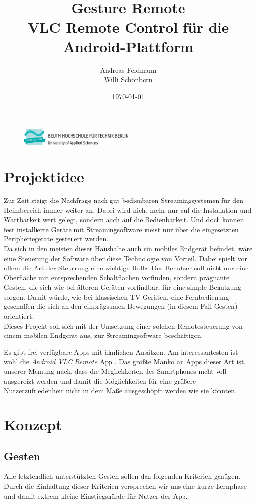 \documentclass[a4paper,12pt]{article}
\title{Gesture Remote \\ VLC Remote Control für die Android-Plattform}
\author{Andreas Feldmann \\ Willi Schönborn}
\date{\today}
\begin{document}
\begin{figure}[H]
\centering
\includegraphics[width=0.5\textwidth]{beuth.eps}
\maketitle
\end{figure}
\newpage
\tableofcontents
\newpage
\section{Projektidee}
Zur Zeit steigt die Nachfrage nach gut bedienbaren Streamingsystemen für den Heimbereich immer weiter an. Dabei wird nicht mehr nur auf die Installation und Wartbarkeit wert gelegt, sondern auch auf die Bedienbarkeit. Und doch können fest installierte Geräte mit Streamingsoftware meist nur über die eingesetzten Peripheriegeräte gesteuert werden. \\
Da sich in den meisten dieser Haushalte auch ein mobiles Endgerät befindet, wäre eine Steuerung der Software über diese Technologie von Vorteil. Dabei spielt vor allem die Art der Steuerung eine wichtige Rolle. Der Benutzer soll nicht nur eine Oberfläche mit entsprechenden Schaltflächen vorfinden, sondern prägnante Gesten, die sich wie bei älteren Geräten vorfindbar, für eine simple Benutzung sorgen. Damit würde, wie bei klassischen TV-Geräten, eine Fernbedienung geschaffen die sich an den einprägsamen Bewegungen (in diesem Fall Gesten) orientiert. \\
Dieses Projekt soll sich mit der Umsetzung einer solchen Remotesteuerung von einem mobilen Endgerät aus, zur Streamingsoftware beschäftigen.

Es gibt frei verfügbare Apps mit ähnlichen Ansätzen. Am interessantesten ist wohl die \textit{Android VLC Remote} App \cite{android-vlc-remote}. Das größte Manko an Apps dieser Art ist, unserer Meinung nach, dass die Möglichkeiten des Smartphones nicht voll ausgereizt werden und damit die Möglichkeiten für eine größere Nutzerzufriedenheit nicht in dem Maße ausgeschöpft werden wie sie könnten.

\newpage
\section{Konzept}

\subsection{Gesten}
Alle letztendlich unterstützten Gesten sollen den folgenden Kriterien genügen. Durch die Einhaltung dieser Kriterien versprechen wir uns eine kurze Lernphase und damit extrem kleine Einstiegshürde für Nutzer der App.
\end{document}
